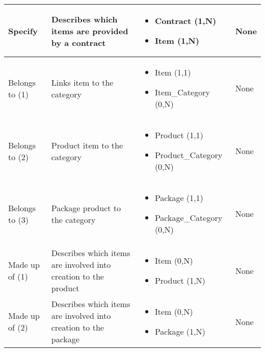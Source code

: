\begin{longtable}{|p{}|p{} |p{}|p{} |}
Specify & Describes which items are provided by a contract  & \begin{itemize}
	\vspace{-1em}
	\item Contract (1,N)
	\item Item (1,N)
	\end{itemize}
&  None\\\hline

Belongs to (1) & Links item to the category  & \begin{itemize}
	\vspace{-1em}
	\item Item (1,1)
	\item Item\_Category (0,N)
\end{itemize}
&  None \\\hline


Belongs to (2) & Product item to the category & \begin{itemize}
	\vspace{-1em}
	\item Product (1,1)
	\item Product\_Category (0,N)
\end{itemize}
&  None \\\hline

Belongs to (3) & Package product to the category  & \begin{itemize}
	\vspace{-1em}
	\item Package (1,1)
	\item Package\_Category (0,N)
\end{itemize}
&  None \\\hline

Made up of (1) & Describes which items are involved into creation to the product & \begin{itemize}
	\vspace{-1em}
	\item Item (0,N)
	\item Product (1,N)
\end{itemize}
&  None \\\hline

Made up of (2) & Describes which items are involved into creation to the package & \begin{itemize}
	\vspace{-1em}
	\item Item (0,N)
	\item Package (1,N)
\end{itemize}
&  None \\\hline



\end{longtable}
